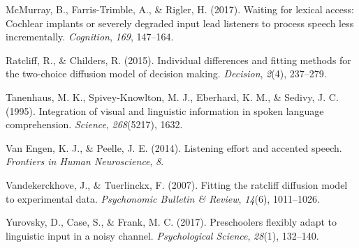 \documentclass[10pt, letterpaper]{article}
\begin{document}
\hypertarget{ref-mcmurray2017waiting}{}
McMurray, B., Farris-Trimble, A., \& Rigler, H. (2017). Waiting for
lexical access: Cochlear implants or severely degraded input lead
listeners to process speech less incrementally. \emph{Cognition},
\emph{169}, 147--164.

\hypertarget{ref-ratcliff2015individual}{}
Ratcliff, R., \& Childers, R. (2015). Individual differences and fitting
methods for the two-choice diffusion model of decision making.
\emph{Decision}, \emph{2}(4), 237--279.

\hypertarget{ref-tanenhaus1995integration}{}
Tanenhaus, M. K., Spivey-Knowlton, M. J., Eberhard, K. M., \& Sedivy, J.
C. (1995). Integration of visual and linguistic information in spoken
language comprehension. \emph{Science}, \emph{268}(5217), 1632.

\hypertarget{ref-van2014listening}{}
Van Engen, K. J., \& Peelle, J. E. (2014). Listening effort and accented
speech. \emph{Frontiers in Human Neuroscience}, \emph{8}.

\hypertarget{ref-vandekerckhove2007fitting}{}
Vandekerckhove, J., \& Tuerlinckx, F. (2007). Fitting the ratcliff
diffusion model to experimental data. \emph{Psychonomic Bulletin \&
Review}, \emph{14}(6), 1011--1026.

\hypertarget{ref-yurovsky2017preschoolers}{}
Yurovsky, D., Case, S., \& Frank, M. C. (2017). Preschoolers flexibly
adapt to linguistic input in a noisy channel. \emph{Psychological
Science}, \emph{28}(1), 132--140.
\end{document}
